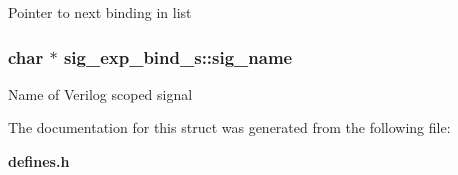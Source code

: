 Pointer to next binding in list 
\subsubsection{\setlength{\rightskip}{0pt plus 5cm}char $\ast$ sig\_\-exp\_\-bind\_\-s::sig\_\-name}\label{structsig__exp__bind__s_m0}


Name of Verilog scoped signal 

The documentation for this struct was generated from the following file:\begin{CompactItemize}
\item 
{\bf defines.h}\end{CompactItemize}
